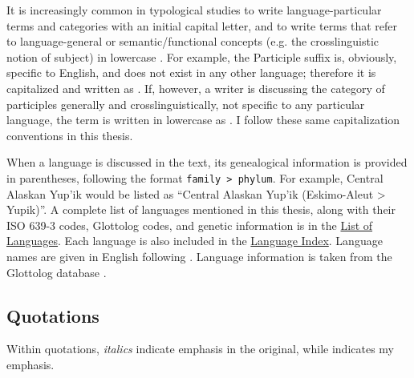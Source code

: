 It is increasingly common in typological studies to write language-particular terms and categories with an initial capital letter, and to write terms that refer to language-general or semantic/functional concepts (e.g. the crosslinguistic notion of subject) in lowercase \parencites[10]{Comrie1976}[47 (fn. 3), 141]{Bybee1985}[66]{Croft2000}[674]{Haspelmath2010a}[535]{Croft2014}. For example, the  Participle suffix  is, obviously, specific to English, and does not exist in any other language; therefore it is capitalized and written as . If, however, a writer is discussing the category of participles generally and crosslinguistically, not specific to any particular language, the term is written in lowercase as . I follow these same capitalization conventions in this thesis.

When a language is discussed in the text, its genealogical information is provided in parentheses, following the format \texttt{family > phylum}. For example, Central Alaskan Yup'ik would be listed as \enquote{Central Alaskan Yup'ik (Eskimo-Aleut > Yupik)}. A complete list of languages mentioned in this thesis, along with their ISO 639-3 codes, Glottolog codes, and genetic information is in the \hyperref[ch:languages]{List of Languages}. Each language is also included in the \hyperref[ch:index]{Language Index}. Language names are given in English following \textcite{Haspelmath2017}. Language information is taken from the Glottolog database \parencite{HammarstromForkelHaspelmath2019}.

\subsection*{Quotations}

Within quotations, \emph{italics} indicate emphasis in the original, while  indicates my emphasis.
